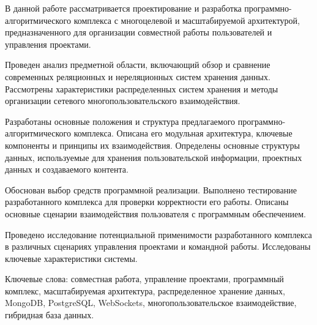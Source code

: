 \begin{essay}{}
    В данной работе рассматривается проектирование и разработка программно-алгоритмического комплекса с многоцелевой и масштабируемой архитектурой, предназначенного для организации совместной работы пользователей и управления проектами.

    Проведен анализ предметной области, включающий обзор и сравнение современных реляционных и нереляционных систем хранения данных. 
    Рассмотрены характеристики распределенных систем хранения и методы организации сетевого многопользовательского взаимодействия.
    
    Разработаны основные положения и структура предлагаемого программно-алгоритмического комплекса.
    Описана его модульная архитектура, ключевые компоненты и принципы их взаимодействия. 
    Определены основные структуры данных, используемые для хранения пользовательской информации, проектных данных и создаваемого контента.
    
    Обоснован выбор средств программной реализации. 
    Выполнено тестирование разработанного комплекса для проверки корректности его работы. 
    Описаны основные сценарии взаимодействия пользователя с программным обеспечением.
    
    Проведено исследование потенциальной применимости разработанного комплекса в различных сценариях управления проектами и командной работы. 
    Исследованы ключевые характеристики системы.
    
    Ключевые слова: совместная работа, управление проектами, программный комплекс, масштабируемая архитектура, распределенное хранение данных, MongoDB, PostgreSQL, WebSockets, многопользовательское взаимодействие, гибридная база данных.
\end{essay}